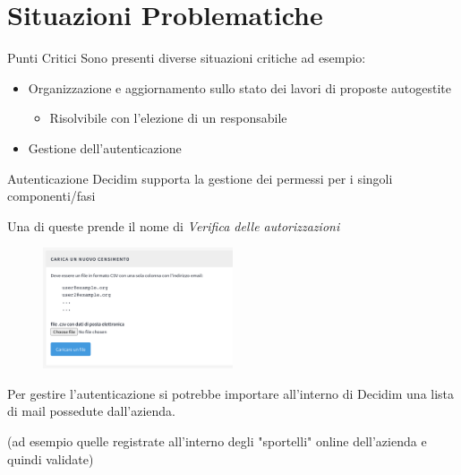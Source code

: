 \section{Situazioni Problematiche}

\begin{frame}{Punti Critici}
  Sono presenti diverse situazioni critiche ad esempio:
  \begin{itemize}[<+- | alert@+>]
    \item Organizzazione e aggiornamento sullo stato dei lavori di proposte autogestite
          \begin{itemize}
            \item Risolvibile con l'elezione di un responsabile
          \end{itemize}
    \item Gestione dell'autenticazione
  \end{itemize}

\end{frame}
\begin{frame}{Autenticazione}
  Decidim supporta la gestione dei permessi per i singoli componenti/fasi

  Una di queste prende il nome di \emph{Verifica delle autorizzazioni}

  \begin{figure}
    \centering
    \includegraphics[width=0.50\textwidth]{images/auth}
  \end{figure}

  Per gestire l'autenticazione si potrebbe importare all'interno di Decidim una lista di mail possedute dall'azienda.

  (ad esempio quelle registrate all'interno degli "sportelli" online dell'azienda e quindi validate)

\end{frame}